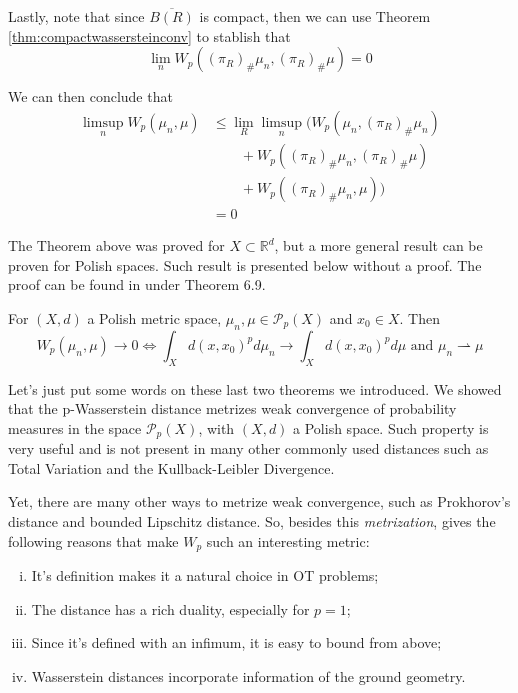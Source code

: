 \begin{prf}
Lastly, note that since $\overline{B(R)}$ is compact, then we can use Theorem \ref{thm:compactwassersteinconv}
to stablish that
\begin{equation*}
  \lim_n W_p((\pi_R)_\#\mu_n,(\pi_R)_\#\mu) = 0
\end{equation*}

We can then conclude that
\begin{align*}
  \limsup_n W_p(\mu_n,\mu) &\leq
  \lim_R \limsup_n (
  W_p(\mu_n,(\pi_R)_\#\mu_n) \\ & \quad \quad+
  W_p((\pi_R)_\#\mu_n,(\pi_R)_\#\mu)\\ & \quad \quad+
  W_p((\pi_R)_\#\mu_n,\mu)) \\
  &= 0
\end{align*}

\end{prf}

The Theorem above was proved for $X \subset \mathbb R^d$,
but a more general result can be proven for Polish spaces. Such result is presented below without a proof.
The proof can be found in \citet{villani2008optimal} under Theorem 6.9.

\begin{theorem}

  For $(X,d)$ a Polish metric space, $\mu_n,\mu \in \mathcal P_p(X)$ and $x_0 \in X$. Then
  \begin{equation}
    W_p(\mu_n,\mu) \to 0 \iff \int_X d(x,x_0)^p d\mu_n \to \int_X d(x,x_0)^p d\mu
    \text{ and } \mu_n \rightharpoonup \mu
  \end{equation}
  \label{thm:polishwmetrize}
\end{theorem}

Let's just put some words on these last two theorems we introduced.
We showed that the p-Wasserstein distance metrizes weak convergence
of probability measures in the space $\mathcal P_p(X)$, with $(X,d)$ a Polish space.
Such property is very useful and is not present in many other commonly used distances such as
Total Variation and the Kullback-Leibler Divergence.

Yet, there are many other ways to metrize weak convergence, such as Prokhorov's distance and bounded
Lipschitz distance. So, besides this \textit{metrization}, \citet{villani2008optimal}
gives the following reasons that make $W_p$ such an interesting metric:
\begin{enumerate}[(i)]
  \item It's definition makes it a natural choice in OT problems;
  \item The distance has a rich duality, especially for $p=1$;
  \item Since it's defined with an infimum, it is easy to bound from above;
  \item Wasserstein distances incorporate information of the ground geometry.
\end{enumerate}

